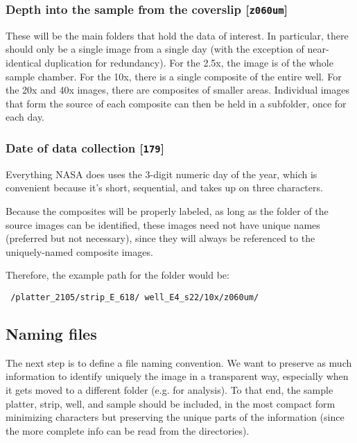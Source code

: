\subsubsection{Depth into the sample from the coverslip [{\tt z060um}]}\hypertarget{depth-into-the-sample-from-the-coverslip-z060um}{}\label{depth-into-the-sample-from-the-coverslip-z060um}
These will be the main folders that hold the data of interest. In particular,
there should only be a single image from a single day (with the exception of
near-identical duplication for redundancy). For the 2.5x, the image is of the
whole sample chamber. For the 10x, there is a single composite of the entire
well. For the 20x and 40x images, there are composites of smaller areas.
Individual images that form the source of each composite can then be held in a
subfolder, once for each day.

\subsubsection{Date of data collection [{\tt 179}]}\hypertarget{date-of-data-collection-179}{}\label{date-of-data-collection-179}
Everything NASA does uses the 3-digit numeric day of the year, which is
convenient because it's short, sequential, and takes up on three characters.

Because the composites will be properly labeled, as long as the folder of the
source images can be identified, these images need not have unique names
(preferred but not necessary), since they will always be referenced to the
uniquely-named composite images.

Therefore, the example path for the folder would be:

{\tt 
/platter\_2105/strip\_E\_618/
well\_E4\_s22/10x/z060um/
}

\subsection{Naming files}\hypertarget{naming-files}{}\label{naming-files}
The next step is to define a file naming convention. We want to preserve as much
information to identify uniquely the image in a transparent way, especially when
it gets moved to a different folder (e.g. for analysis). To that end, the sample
platter, strip, well, and sample should be included, in the most compact form
minimizing characters but preserving the unique parts of the information (since
the more complete info can be read from the directories).


